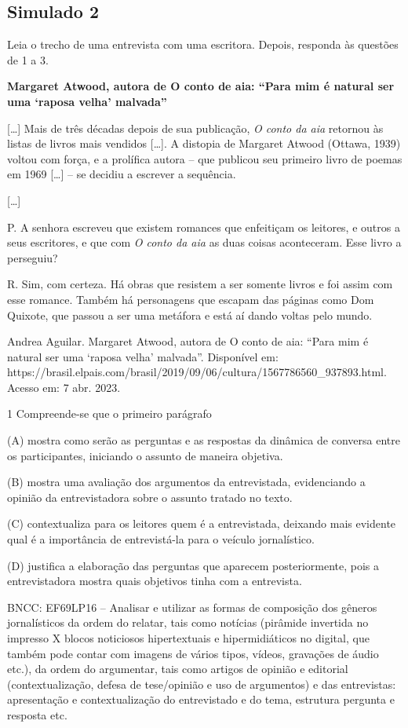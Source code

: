 \begin{itemize}
\begin{itemize}
{\begin{itemize}
\begin{itemize}
\begin{escolha}
\begin{escolha}
\begin{escolha}
\begin{escolha}
\begin{escolha}
\chapter{Simulado 2}

Leia o trecho de uma entrevista com uma escritora. Depois, responda às
questões de 1 a 3.

\textbf{Margaret Atwood, autora de O conto de aia: ``Para mim é natural
ser uma `raposa velha' malvada''}

{[}\ldots{}{]} Mais de três décadas depois de sua publicação, \emph{O
conto da aia} retornou às listas de livros mais vendidos {[}\ldots{}{]}.
A distopia de Margaret Atwood (Ottawa, 1939) voltou com força, e a
prolífica autora -- que publicou seu primeiro livro de poemas em 1969
{[}\ldots{}{]} -- se decidiu a escrever a sequência.

{[}\ldots{}{]}

P. A senhora escreveu que existem romances que enfeitiçam os leitores, e
outros a seus escritores, e que com \emph{O conto da aia} as duas coisas
aconteceram. Esse livro a perseguiu?

R. Sim, com certeza. Há obras que resistem a ser somente livros e foi
assim com esse romance. Também há personagens que escapam das páginas
como Dom Quixote, que passou a ser uma metáfora e está aí dando voltas
pelo mundo.

Andrea Aguilar. Margaret Atwood, autora de O conto de aia: ``Para mim é
natural ser uma `raposa velha' malvada''. Disponível em:
https://brasil.elpais.com/brasil/2019/09/06/cultura/1567786560\_937893.html.
Acesso em: 7 abr. 2023.

\num{1} Compreende-se que o primeiro parágrafo

(A) mostra como serão as perguntas e as respostas da dinâmica de
conversa entre os participantes, iniciando o assunto de maneira
objetiva.

(B) mostra uma avaliação dos argumentos da entrevistada, evidenciando a
opinião da entrevistadora sobre o assunto tratado no texto.

(C) contextualiza para os leitores quem é a entrevistada, deixando mais
evidente qual é a importância de entrevistá-la para o veículo
jornalístico.

(D) justifica a elaboração das perguntas que aparecem posteriormente,
pois a entrevistadora mostra quais objetivos tinha com a entrevista.

BNCC: EF69LP16 -- Analisar e utilizar as formas de composição dos
gêneros jornalísticos da ordem do relatar, tais como notícias (pirâmide
invertida no impresso X blocos noticiosos hipertextuais e
hipermidiáticos no digital, que também pode contar com imagens de vários
tipos, vídeos, gravações de áudio etc.), da ordem do argumentar, tais
como artigos de opinião e editorial (contextualização, defesa de
tese/opinião e uso de argumentos) e das entrevistas: apresentação e
contextualização do entrevistado e do tema, estrutura pergunta e
resposta etc.


\end{escolha}
\end{escolha}
\end{escolha}
\end{escolha}
\end{escolha}
\end{itemize}
\end{itemize}}
\end{itemize}
\end{itemize}
